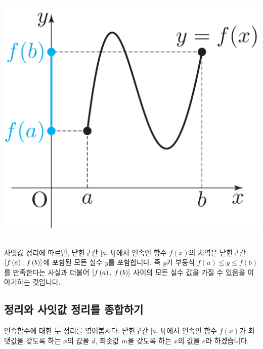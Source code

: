 \begin{center} \includegraphics[scale=\pgfkeysvalueof{picsize}]{DBs/pic/zerg_07.pdf}\
	\end{center}사잇값 정리에 따르면, 닫힌구간 $\left[a,\: b\right]$에서 연속인 함수 $f\left( x \right) $의 치역은 닫힌구간 $\left[f\left( a \right) ,\: f\left( b \right) \right]$에 포함된 모든 실수 $y$를 포함합니다. 즉 $y$가 부등식 $f\left( a \right) \le y \le f\left( b \right) $를 만족한다는 사실과 더불어 $\left[f\left( a \right) ,\: f\left( b \right) \right]$ 사이의 모든 실수 값을  가질 수 있음을 이야기하는 것입니다.
\clearpage
\subsection{\Mmi{} 정리와 사잇값 정리를 종합하기}
연속함수에 대한 두 정리를 엮어봅시다. 닫힌구간 $\left[a,\: b\right]$에서 연속인 함수 $f\left( x \right) $가 최댓값을 갖도록 하는 $x$의 값을 $d$, 최솟값 $m$을 갖도록 하는 $x$의 값을 $e$라 하겠습니다.

